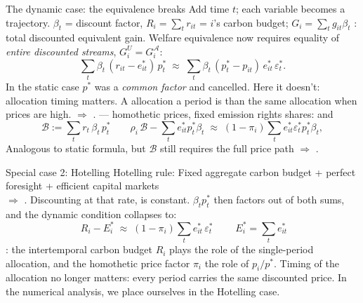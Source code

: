 \documentclass[aspectratio=169,xcolor=dvipsnames, 11pt,mathserif]{beamer}
\newcommand{\eed}{\ee\vspace{-\dimexpr 2\topsep+\parskip+\medskipamount-3pt\relax}}
\begin{document}
\begin{frame}{The dynamic case: the equivalence breaks\label{dynamic}}
\bbvsp
\ip Add time $t$; each variable becomes a trajectory. $\beta_t$ = discount factor, $R_i=\sum_t r_{it}$ = $i$'s carbon budget;  $G_i = \sum_t g_{it}\beta_t$ : total discounted equivalent gain.
\ip Welfare equivalence now requires equality of \textit{entire discounted streams}, $G_i^U = G_i^{\mathcal{A}}$:
\[ \sum_t \beta_t\,(r_{it}-e_{it}^*)\,p_t^* \;\approx\; \sum_t \beta_t\,(p_t^*-p_{it})\,e_{it}^*\,\varepsilon_t^*. \]
\ee
\bbvsp
\ip In the static case $p^*$ was a \textit{common factor} and cancelled. Here it doesn't: allocation timing matters.
  \bbvsp
  \ip A  allocation  a  period is  than the same allocation when prices are high.
  \ip $\Rightarrow$ . %
  \ee
\ip {} --- homothetic prices, fixed emission rights shares:  and 
\[ \mathcal{B}:=\sum_t r_t\,\beta_t\,p_t^* \qquad  \rho_i\,\mathcal{B} - \sum_t e_{it}^*p_t^*\beta_t \;\approx\; (1-\pi_i)\sum_t e_{it}^*\varepsilon_t^*p_t^*\beta_t,  \]
\eed
\bbvsp
\ip Analogous to static formula, but $\mathcal{B}$ still requires the full price path $\Rightarrow$ .
\ee
\end{frame}


\begin{frame}{Special case 2: Hotelling\label{hotelling}}
\bbvs
\ip Hotelling rule: Fixed aggregate carbon budget + perfect foresight + efficient capital markets \\ $\Rightarrow$ . Discounting at that rate,  is constant.
\ip $\beta_t p_t^*$ then factors out of both sums, and the dynamic condition collapses to:
\[ \boxed{\;R_i - E_i^* \;\approx\; (1-\pi_i)\sum_t e_{it}^*\,\varepsilon_t^*\;} \qquad E_i^*=\sum_t e_{it}^*\]
\eed
\bbvsp
\ip {}: the intertemporal carbon budget $R_i$ plays the role of the single-period allocation, and the homothetic price factor $\pi_i$ the role of $p_i/p^*$.
\ip Timing of the allocation no longer matters: every period carries the same discounted price.
\ip In the numerical analysis, we place ourselves in the Hotelling case. %
\ee
\end{frame}
\end{document}
